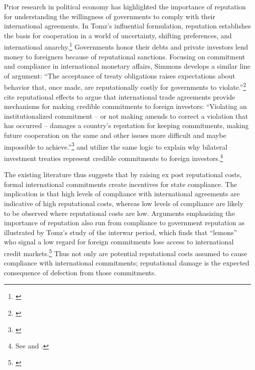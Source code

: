 \documentclass[12pt,onesided]{amsart}
\begin{document}
Prior research in political economy has highlighted the importance of reputation for understanding the willingness of governments to comply with their international agreements. In Tomz's influential formulation, reputation establishes the basis for cooperation in a world of uncertainty, shifting preferences, and international anarchy.\footnote{\citet{tomz:2007}} Governments honor their debts and private investors lend money to foreigners because of reputational sanctions. Focusing on commitment and compliance in international monetary affairs, Simmons develops a similar line of argument: ``The acceptance of treaty obligations raises expectations about behavior that, once made, are reputationally costly for governments to violate.''\footnote{\citet[819]{simmons:2000}} \citeauthor{buthe:milner:2008} cite reputational effects to argue that international trade agreements provide mechanisms for making credible commitments to foreign investors: ``Violating an institutionalized commitment -- or not making amends to correct a violation that has occurred -- damages a country's reputation for keeping commitments, making future cooperation on the same and other issues more difficult and maybe impossible to achieve.''\footnote{\citet[746]{buthe:milner:2008}}  \citeauthor{buthe:milner:2009} and \citeauthor{elkins:etal:2006} utilize the same logic to explain why bilateral investment treaties represent credible commitments to foreign investors.\footnote{See \citet{buthe:milner:2009} and \citet{elkins:etal:2006}.}

The existing literature thus suggests that by raising ex post reputational costs, formal international commitments create incentives for state compliance. The implication is that high levels of compliance with international agreements are indicative of high reputational costs, whereas low levels of compliance are likely to be observed where reputational costs are low. Arguments emphasizing the importance of reputation also run from compliance to government reputation as illustrated by Tomz's study of the interwar period, which finds that ``lemons'' who signal a low regard for foreign commitments lose access to international credit markets.\footnote{\citet[86--94]{tomz:2007}} Thus not only are potential reputational costs assumed to cause compliance with international commitments; reputational damage is the expected consequence of defection from those commitments. 
\end{document}
